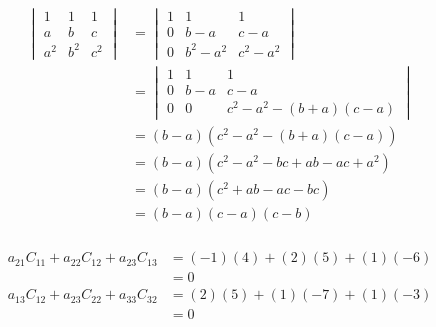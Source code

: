 \documentclass{article}
\begin{document}
\setcounter{subsubsection}{36}
\subsubsection{}

\begin{align*}
  \begin{vmatrix}
    1   & 1   & 1   \\
    a   & b   & c   \\
    a^2 & b^2 & c^2
  \end{vmatrix} & = \begin{vmatrix}
                      1 & 1         & 1         \\
                      0 & b - a     & c - a     \\
                      0 & b^2 - a^2 & c^2 - a^2
                    \end{vmatrix}                        \\
                     & = \begin{vmatrix}
                           1 & 1     & 1                          \\
                           0 & b - a & c - a                      \\
                           0 & 0     & c^2 - a^2 - (b + a)(c - a)
                         \end{vmatrix}      \\
                     & = (b - a) (c^2 - a^2 - (b + a) (c - a))       \\
                     & = (b - a) (c^2 - a^2 - b c + a b - a c + a^2) \\
                     & = (b - a) (c^2 + a b - a c - b c)             \\
                     & = (b - a) (c - a) (c - b)
\end{align*}

\setcounter{subsubsection}{38}
\subsubsection{}

\begin{align*}
  a_{21} C_{11} + a_{22} C_{12} + a_{23} C_{13} & = (-1) (4) + (2) (5) + (1) (-6) \\
                                                & = 0                             \\
  a_{13} C_{12} + a_{23} C_{22} + a_{33} C_{32} & = (2) (5) + (1) (-7) + (1) (-3) \\
                                                & = 0
\end{align*}
\end{document}
